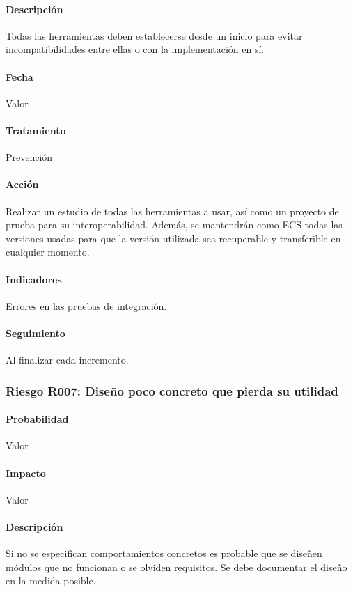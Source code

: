 \documentclass[10pt,a4paper]{article}
\begin{document}
				\paragraph{Descripción} Todas las herramientas deben establecerse desde un inicio para evitar incompatibilidades entre ellas o con la implementación en sí.
				\paragraph{Fecha} Valor %
				\paragraph{Tratamiento} Prevención %
				\paragraph{Acción} Realizar un estudio de todas las herramientas a usar, así como un proyecto de prueba para su interoperabilidad. Además, se mantendrán como ECS todas las versiones usadas para que la versión utilizada sea recuperable y transferible en cualquier momento. %
				\paragraph{Indicadores} Errores en las pruebas de integración. %
				\paragraph{Seguimiento}	Al finalizar cada incremento. %
				
				\subsubsection{Riesgo R007: Diseño poco concreto que pierda su utilidad}
				\paragraph{Probabilidad} Valor
				\paragraph{Impacto}	Valor
				\paragraph{Descripción} Si no se especifican comportamientos concretos es probable que se diseñen módulos que no funcionan o se olviden requisitos. Se debe documentar el diseño en la medida posible.
\end{document}
